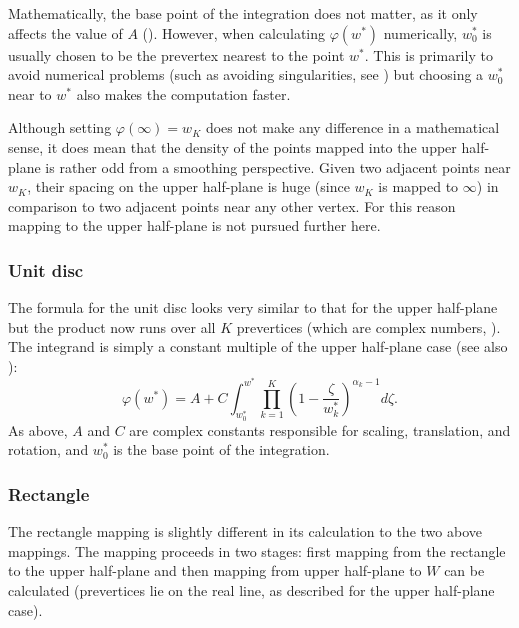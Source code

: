 Mathematically, the base point of the integration does not matter, as it only affects the value of $A$ (\cite[p. 3]{driscoll}).\label{cor-3s14-3} However, when calculating $\varphi(w^*)$ numerically, $w^*_0$\label{cor-3s14-2} is usually chosen to be the prevertex nearest to the point $w^*$. This is primarily to avoid numerical problems (such as avoiding singularities, see ) but choosing a $w^*_0$ near to $w^*$ also makes the computation faster.

Although setting $\varphi(\infty) = w_K$ does not make any difference in a mathematical sense, it does mean that the density of the points mapped into the upper half-plane is rather odd from a smoothing perspective. Given two adjacent points near $w_K$, their spacing on the upper half-plane is huge (since $w_K$ is mapped to $\infty$) in comparison to two adjacent points \label{cor-e6}near any other vertex. For this reason mapping to the upper half-plane is not pursued further here.

\subsubsection{Unit disc}

The formula for the unit disc looks very similar to that for the upper half-plane but the product now runs over all $K$ prevertices (which are complex numbers, )\label{cor-3s13-3}. The integrand is simply a constant multiple of the upper half-plane case (see also \cite[p. 12]{driscoll}):\label{cor-e5}
\begin{equation}
\label{unitscmap}
\varphi(w^*) = A + C \int^{w^*}_{w^*_0} \prod_{k=1}^{K} \left (1 - \frac{\zeta}{w^*_k} \right )^{\alpha_k-1} d\zeta.
\end{equation}
As above, $A$ and $C$ are complex constants responsible for scaling, translation, and rotation, and $w^*_0$ is the base point of the integration.

\subsubsection{Rectangle}
\label{cor-3s13-4}\label{cor-3s15-2}\label{cor-r29}\label{cor-r29-4}\label{cor-r29-5}\label{cor-r29-2}

The rectangle mapping is slightly different in its calculation to the two above mappings. The mapping proceeds in two stages: first mapping from the rectangle to the upper half-plane and then mapping from upper half-plane to $W$ can be calculated (prevertices lie on the real line, as described for the upper half-plane case). 


